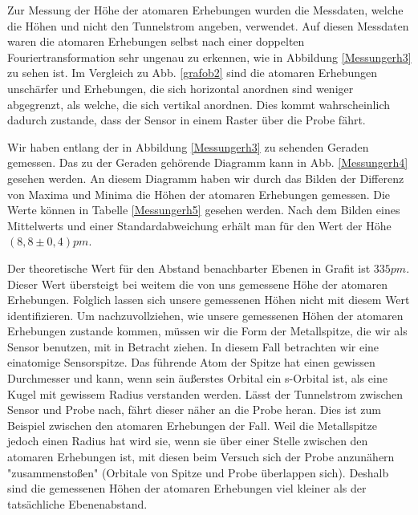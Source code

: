 \documentclass[10pt,a4paper]{article}
\begin{document}
Zur Messung der Höhe der atomaren Erhebungen wurden die Messdaten, welche die Höhen und nicht den Tunnelstrom angeben, verwendet. Auf diesen Messdaten waren die atomaren Erhebungen selbst nach einer doppelten Fouriertransformation sehr ungenau zu erkennen, wie in Abbildung \ref{Messungerh3} zu sehen ist. Im Vergleich zu Abb. \ref{grafob2} sind die atomaren Erhebungen unschärfer und Erhebungen, die sich horizontal anordnen sind weniger abgegrenzt, als welche, die sich vertikal anordnen. Dies kommt wahrscheinlich dadurch zustande, dass der Sensor in einem Raster über die Probe fährt.

 Wir haben entlang der in Abbildung \ref{Messungerh3} zu sehenden Geraden gemessen. Das zu der Geraden gehörende Diagramm kann in Abb. \ref{Messungerh4} gesehen werden. An diesem Diagramm haben wir durch das Bilden der Differenz von Maxima und Minima die Höhen der atomaren Erhebungen gemessen. Die Werte können in Tabelle \ref{Messungerh5} gesehen werden. Nach dem Bilden eines Mittelwerts und einer Standardabweichung erhält man für den Wert der Höhe $(8,8 \pm 0,4) pm$.

Der theoretische Wert für den Abstand benachbarter Ebenen in Grafit ist $335 pm$. Dieser Wert übersteigt bei weitem die von uns gemessene Höhe der atomaren Erhebungen. Folglich lassen sich unsere gemessenen Höhen nicht mit diesem Wert identifizieren. Um nachzuvollziehen, wie unsere gemessenen Höhen der atomaren Erhebungen zustande kommen, müssen wir die Form der Metallspitze, die wir als Sensor benutzen, mit in Betracht ziehen. In diesem Fall betrachten wir eine einatomige Sensorspitze. Das führende Atom der Spitze hat einen gewissen Durchmesser und kann, wenn sein äußerstes Orbital ein s-Orbital ist, als eine Kugel mit gewissem Radius verstanden werden. Lässt der Tunnelstrom zwischen Sensor und Probe nach, fährt dieser näher an die Probe heran. Dies ist zum Beispiel zwischen den atomaren Erhebungen der Fall. Weil die Metallspitze jedoch einen Radius hat wird sie, wenn sie über einer Stelle zwischen den atomaren Erhebungen ist, mit diesen beim Versuch sich der Probe anzunähern "zusammenstoßen" (Orbitale von Spitze und Probe überlappen sich). Deshalb sind die gemessenen Höhen der atomaren Erhebungen viel kleiner als der tatsächliche Ebenenabstand.
\end{document}
